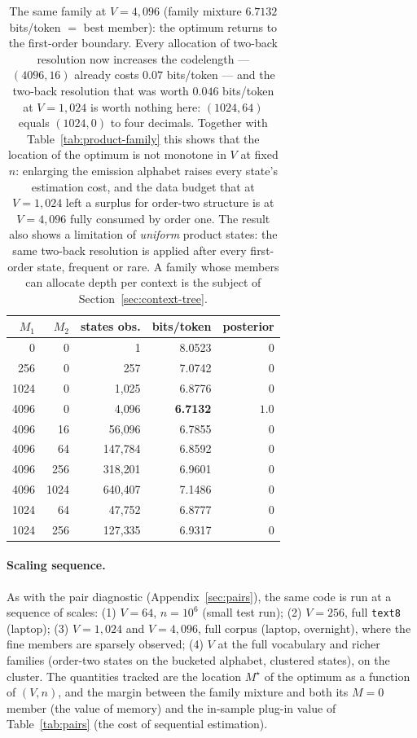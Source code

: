 \documentclass[11pt]{article}
\begin{document}
\begin{table}[ht]
\centering
\begin{tabular}{rrrrr}
\toprule
$M_1$ & $M_2$ & states obs. & bits/token & posterior \\
\midrule
    0 &    0 &        1 & 8.0523 & $0$ \\
  256 &    0 &      257 & 7.0742 & $0$ \\
 1024 &    0 &    1{,}025 & 6.8776 & $0$ \\
 4096 &    0 &    4{,}096 & \textbf{6.7132} & $1.0$ \\
 4096 &   16 &   56{,}096 & 6.7855 & $0$ \\
 4096 &   64 &  147{,}784 & 6.8592 & $0$ \\
 4096 &  256 &  318{,}201 & 6.9601 & $0$ \\
 4096 & 1024 &  640{,}407 & 7.1486 & $0$ \\
 1024 &   64 &   47{,}752 & 6.8777 & $0$ \\
 1024 &  256 &  127{,}335 & 6.9317 & $0$ \\
\bottomrule
\end{tabular}
\caption{The same family at $V=4{,}096$ (family mixture $6.7132$
  bits/token $=$ best member): the optimum returns to the first-order
  boundary.  Every allocation of two-back resolution now increases the
  codelength --- $(4096, 16)$ already costs $0.07$ bits/token --- and
  the two-back resolution that was worth $0.046$ bits/token at
  $V=1{,}024$ is worth nothing here: $(1024,64)$ equals $(1024,0)$ to
  four decimals.  Together with Table~\ref{tab:product-family} this
  shows that the location of the optimum is not monotone in $V$ at
  fixed $n$: enlarging the emission alphabet raises every state's
  estimation cost, and the data budget that at $V=1{,}024$ left a
  surplus for order-two structure is at $V=4{,}096$ fully consumed by
  order one.  The result also shows a limitation of \emph{uniform}
  product states: the same two-back resolution is applied after every
  first-order state, frequent or rare.  A family whose members can
  allocate depth per context is the subject of
  Section~\ref{sec:context-tree}.}
\label{tab:product-family-4096}
\end{table}

\paragraph{Scaling sequence.}
As with the pair diagnostic (Appendix~\ref{sec:pairs}), the same code is run at a sequence of
scales: (1) $V=64$, $n=10^6$ (small test run); (2) $V=256$, full
\texttt{text8} (laptop); (3) $V=1{,}024$ and $V=4{,}096$, full corpus
(laptop, overnight), where the fine members are sparsely observed;
(4) $V$ at the full vocabulary and richer families (order-two states on
the bucketed alphabet, clustered states), on the cluster.  The
quantities tracked are the location $M^\star$ of the optimum as a
function of $(V, n)$, and the margin between the family mixture and
both its $M=0$ member (the value of memory) and the in-sample plug-in
value of Table~\ref{tab:pairs} (the cost of sequential estimation).
\end{document}
